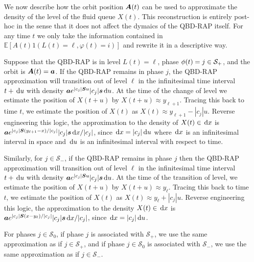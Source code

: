 We now describe how the orbit position \(\boldsymbol A(t)\) can be used to approximate the density of the level of the fluid queue \(X(t)\). This reconstruction is entirely post-hoc in the sense that it does not affect the dymaics of the QBD-RAP itself. For any time \(t\) we only take the information contained in \(\mathbb E[A(t)1(L(t)=\ell,\varphi(t)=i)]\) and rewrite it in a descriptive way. 

Suppose that the QBD-RAP is in level \(L(t)=\ell\), phase \(\phi(t)=j\in\mathcal{S}_+\), and the orbit is \(\boldsymbol A(t)=\boldsymbol a\). If the QBD-RAP remains in phase \(j\), the QBD-RAP approximation will transition out of level \(\ell\) in the infinitesimal time interval \(t+\, \mathrm{d} u\) with density \(\boldsymbol a e^{|c_j|\boldsymbol{S}u}|c_j|\boldsymbol s\, \mathrm{d} u\). At the time of the change of level we estimate the position of \(X(t+u)\) by \(X(t+u)\approx y_{\ell+1}\). Tracing this back to time \(t\), we estimate the position of \(X(t)\) as \(X(t)\approx y_{\ell+1} - |c_j|u\). Reverse engineering this logic, the approximation to the density of \(X(t) \in\, \mathrm{d} x\) is \(\boldsymbol a e^{|c_j|\boldsymbol S(y_{\ell+1}-x)/|c_j|}|c_j|\boldsymbol s \, \mathrm{d} x/|c_j|\), since \(\, \mathrm{d} x = |c_j|\, \mathrm{d} u\) where \(\, \mathrm{d} x\) is an infinitesimal interval in space and \(\, \mathrm{d} u\) is an infinitesimal interval with respect to time.

Similarly, for \(j\in\mathcal S_-\), if the QBD-RAP remains in phase \(j\) then the QBD-RAP approximation will transition out of level \(\ell\) in the infinitesimal time interval \(t+\, \mathrm{d} u\) with density \(\boldsymbol a e^{|c_j|\boldsymbol{S}u}|c_j|\boldsymbol s\, \mathrm{d} u\). At the time of the transition of level, we estimate the position of \(X(t+u)\) by \(X(t+u)\approx y_{\ell}\). Tracing this back to time \(t\), we estimate the position of \(X(t)\) as \(X(t)\approx y_{\ell} + |c_j|u\). Reverse engineering this logic, the approximation to the density \(X(t) \in\, \mathrm{d} x\) is \(\boldsymbol a e^{|c_j|\boldsymbol S(x-y_{\ell})/|c_j|}|c_j|\boldsymbol s \, \mathrm{d} x/|c_j|\), since \(\, \mathrm{d} x = |c_j|\, \mathrm{d} u\). 

For phases \(j\in\mathcal S_0\), if phase \(j\) is associated with \(\mathcal S_+\), we use the same approximation as if \(j\in \mathcal S_+\), and if phase \(j\in\mathcal S_0\) is associated with \(\mathcal S_-\), we use the same approximation as if \(j\in \mathcal S_-\).

